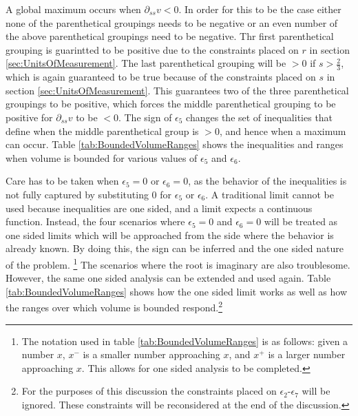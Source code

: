 A global maximum occurs when $\partial_{ss} v<0$. In order for this to be the case either none of the parenthetical groupings needs to be negative or an even number of the above parenthetical groupings need to be negative. Thr first parenthetical grouping is guarintted to be positive due to the constraints placed on $r$ in section \ref{sec:UnitsOfMeasurement}. The last parenthetical grouping will be $>0$ if $s>\frac{2}{3}$, which is again guaranteed to be true because of the constraints placed on $s$ in section \ref{sec:UnitsOfMeasurement}. This guarantees two of the three parenthetical groupings to be positive, which forces the middle parenthetical grouping to be positive for $\partial_{ss} v$ to be $<0$. The sign of $\epsilon_5$ changes the set of inequalities that define when the middle parenthetical group is $>0$, and hence when a maximum can occur. Table \ref{tab:BoundedVolumeRanges} shows the inequalities and ranges when volume is bounded for various values of $\epsilon_5$ and $\epsilon_6$.

Care has to be taken when $\epsilon_5=0$ or $\epsilon_6=0$, as the behavior of the inequalities is not fully captured by substituting $0$ for $\epsilon_5$ or $\epsilon_6$. A traditional limit cannot be used because inequalities are one sided, and a limit expects a continuous function. Instead, the four scenarios where $\epsilon_5=0$ and $\epsilon_6=0$ will be treated as one sided limits which will be approached from the side where the behavior is already known. By doing this, the sign can be inferred and the one sided nature of the problem. \footnote{The notation used in table \ref{tab:BoundedVolumeRanges} is as follows: given a number $x$, $x^-$ is a smaller number approaching $x$, and $x^+$ is a larger number approaching $x$. This allows for one sided analysis to be completed.} The scenarios where the root is imaginary are also troublesome. However, the same one sided analysis can be extended and used again. Table \ref{tab:BoundedVolumeRanges} shows how the one sided limit works as well as how the ranges over which volume is bounded respond.\footnote{For the purposes of this discussion the constraints placed on $\epsilon_2$-$\epsilon_7$ will be ignored. These constraints will be reconsidered at the end of the discussion.}


